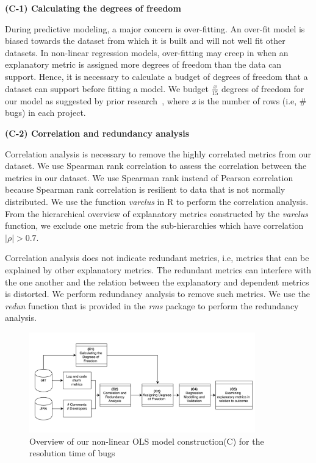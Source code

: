 

\noindent \textbf{(C-1) Calculating the degrees of freedom}

During predictive modeling, a major concern is over-fitting. An over-fit model is biased towards the dataset from which it is built and will not well fit other datasets. In non-linear regression models, over-fitting may creep in when an explanatory metric is assigned more degrees of freedom than the data can support. Hence, it is necessary to calculate a budget of degrees of freedom that a dataset can support before fitting a model. We budget $\frac{x}{15}$ degrees of freedom for our model as suggested by prior research~\cite{DegreesofFreedom}, where \textsl{x} is the number of rows (i.e, \# bugs) in each project. 


\noindent \textbf{(C-2) Correlation and redundancy analysis}

Correlation analysis is necessary to remove the highly correlated metrics from our dataset. We use Spearman rank correlation to assess the correlation between the metrics in our dataset. We use Spearman rank instead of Pearson correlation because Spearman rank correlation is resilient to data that is not normally distributed. We use the function \textsl{varclus} in R to perform the correlation analysis. From the hierarchical overview of explanatory metrics constructed by the \emph{varclus} function, we exclude one metric from the sub-hierarchies which have correlation $|\rho| > 0.7 $.

Correlation analysis does not indicate redundant metrics, i.e, metrics that can be explained by other explanatory metrics. The redundant metrics can interfere with the one another and the relation between the explanatory and dependent metrics is distorted. We perform redundancy analysis to remove such metrics. We use the \textsl{redun} function that is provided in the \textsl{rms} package to perform the redundancy analysis.

\begin{figure}
	\centering
	\includegraphics[width=9.8cm]{MethodologyOLS}
	\caption{Overview of our non-linear OLS model construction(C) for the resolution time of bugs}
	\label{fig:MethodologyOLS}
\end{figure}



